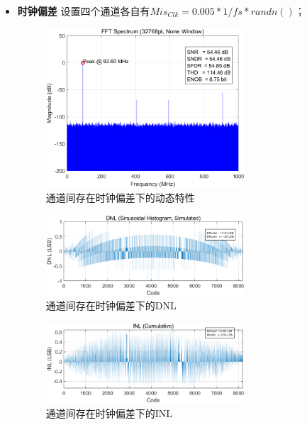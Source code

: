 \documentclass[cs4size,a4paper]{ctexart}
\numberwithin{equation}{section}
\numberwithin{table}{section}
\numberwithin{figure}{section}
\begin{document}
\begin{itemize}
		\item \textbf{时钟偏差} 设置四个通道各自有$Mis_{Clk} = 0.005 * 1/fs * randn()$；
		\begin{figure}[H]
			\centering
			\includegraphics[width=0.7\textwidth]{pic/TIC/DFT.png}
			\caption{通道间存在时钟偏差下的动态特性} 
		\end{figure}

		\begin{figure}[H]
			\centering
			\includegraphics[width=0.7\textwidth]{pic/TIC/DNL.png}
			\caption{通道间存在时钟偏差下的DNL} 
		\end{figure}

		\begin{figure}[H]
			\centering
			\includegraphics[width=0.7\textwidth]{pic/TIC/INL.png}
			\caption{通道间存在时钟偏差下的INL} 
		\end{figure}
	\end{itemize}
\end{document}
